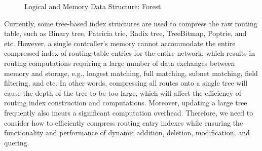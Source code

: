 \begin{figure}
\centering
{}

{}
\caption{\small Logical and Memory Data Structure: Forest}
\label{fig:foreststructure}
\end{figure}


Currently, some tree-based index structures are used to compress the raw routing table, such as Binary tree\cite{binarytree}, Patricia trie\cite{szpankowski1990patricia}, Radix tree\cite{sklower1991tree}, TreeBitmap\cite{eatherton2004tree}, Poptrie\cite{asai2015poptrie}, and etc. However, a single {\sys} controller's memory cannot accommodate the entire compressed index of routing table entries for the entire network, which results in routing computations requiring a large number of data exchanges between memory and storage, e.g., longest matching, full matching, subnet matching, field filtering, and etc. In other words, compressing all routes onto a single tree will cause the depth of the tree to be too large, which will affect the efficiency of routing index construction and computations. Moreover, updating a large tree frequently also incurs a significant computation overhead. Therefore, we need to consider how to efficiently compress routing entry indexes while ensuring the functionality and performance of dynamic addition, deletion, modification, and quering.

